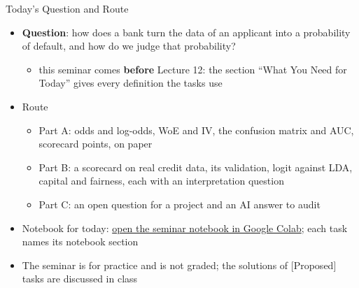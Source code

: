 \begin{frame}{Today's Question and Route}
\itemsize{\small}
\begin{itemize}
    \item \textbf{Question}: how does a bank turn the data of an applicant into a probability of default, and how do we judge that probability?
    \begin{itemize}
        \item this seminar comes \textbf{before} Lecture 12: the section ``What You Need for Today'' gives every definition the tasks use
    \end{itemize}
    \item Route
    \begin{itemize}
        \item Part A: odds and log-odds, WoE and IV, the confusion matrix and AUC, scorecard points, on paper
        \item Part B: a scorecard on real credit data, its validation, logit against LDA, capital and fairness, each with an interpretation question
        \item Part C: an open question for a project and an AI answer to audit
    \end{itemize}
    \item Notebook for today: \href{\nb}{open the seminar notebook in Google Colab}; each task names its notebook section
    \item The seminar is for practice and is not graded; the solutions of [Proposed] tasks are discussed in class
\end{itemize}
\end{frame}

